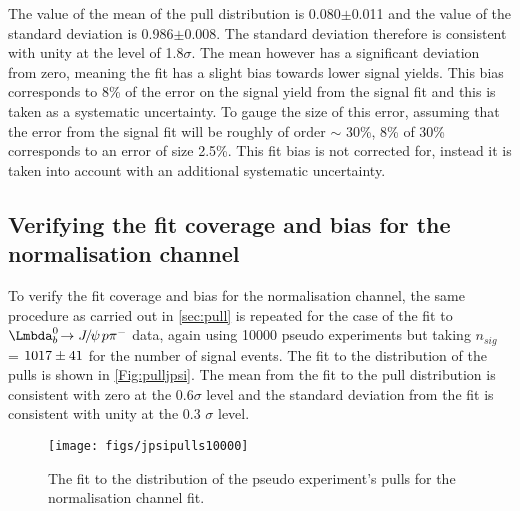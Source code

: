 The value of the mean of the pull distribution is 0.080$\pm$0.011 and the value of the standard deviation is 0.986$\pm$0.008. The standard deviation therefore is consistent with unity at the level of 1.8$\sigma$. The mean however has a significant deviation from zero, meaning the fit has a slight bias towards lower signal yields. This bias corresponds to 8\% of the error on the signal yield from the signal fit and this is taken as a systematic uncertainty. To gauge the size of this error, assuming that the error from the signal fit will be roughly of order $\sim$ 30\%, 8\% of 30\% corresponds to an error of size 2.5\%.  This fit bias is not corrected for, instead it is taken into account with an additional systematic uncertainty.
\subsection{Verifying the fit coverage and bias for the normalisation channel}
To verify the fit coverage and bias for the normalisation channel, the same procedure as carried out in \autoref{sec:pull} is repeated for the case of the fit to $\Lbpijpsi$ data, again using 10000 pseudo experiments but taking $n_{sig}$ = $1017\pm41$ for the number of signal events. The fit to the distribution of the pulls is shown in  \autoref{Fig:pulljpsi}. The mean from the fit to the pull distribution is consistent with zero at the 0.6$\sigma$ level and the standard deviation from the fit is consistent with unity at the 0.3 $\sigma$ level.
\begin{figure}[h!]
  \def\nh{0.7\textwidth}
  \centering
  \hspace*{-1.0cm}
  \texttt{[image: figs/jpsipulls10000]}
\caption{The fit to the distribution of the pseudo experiment's pulls for the normalisation channel fit. }%
  \label{Fig:pulljpsi}
\end{figure}



